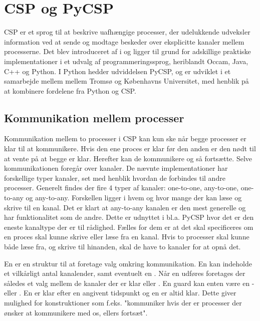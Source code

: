 \chapter{CSP og PyCSP}
CSP er et sprog til at beskrive uafhængige processer, der udelukkende udveksler information ved at sende og modtage beskeder over eksplicitte kanaler mellem processerne. Det blev introduceret af \citeauthor{hoare-csp} i \cite{hoare-csp} og ligger til grund for adskillige praktiske implementationer i et udvalg af programmeringssprog, heriblandt Occam, Java, C++ og Python\cite{May1983, jcsp, Brown07, pycsp}. I Python hedder udviddelsen PyCSP, og er udviklet i et samarbejde mellem mellem Tromsø og Københavns Universitet, med henblik på at kombinere fordelene fra Python og CSP. 

\section{Kommunikation mellem processer}
Kommunikation mellem to processer i CSP kan kun ske når begge processer er klar til at kommunikere. Hvis den ene proces er klar før den anden er den nødt til at vente på at begge er klar. Herefter kan de kommunikere og så fortsætte. Selve kommunikationen foregår over kanaler. De nævnte implementationer har forskellige typer kanaler, set med henblik hvordan de forbindes til andre processer. Generelt findes der fire 4 typer af kanaler: one-to-one, any-to-one, one-to-any og any-to-any. Forskellen ligger i hvem og hvor mange der kan læse og skrive til en kanal. Det er klart at any-to-any kanalen er den mest generelle og har funktionalitet som de andre. Dette er udnyttet i bl.a. PyCSP hvor det er den eneste kanaltype der er til rådighed. Fælles for dem er at det skal specificeres om en proces skal kunne skrive eller læse fra en kanal. Hvis to processer skal kunne både læse fra, og skrive til hinanden, skal de have to kanaler for at opnå det. 

En  er en struktur til at foretage valg omkring kommunikation. En  kan indeholde et vilkårligt antal kanalender, samt eventuelt en . Når en  udføres foretages der således et valg mellem de kanaler der er klar eller . En guard kan enten være en - eller . En  er klar efter en angivent tidspunkt og en  er altid klar. Dette giver mulighed for konstruktioner som f.eks. "kommuniker hvis der er processer der ønsker at kommunikere med os, ellers fortsæt". 

